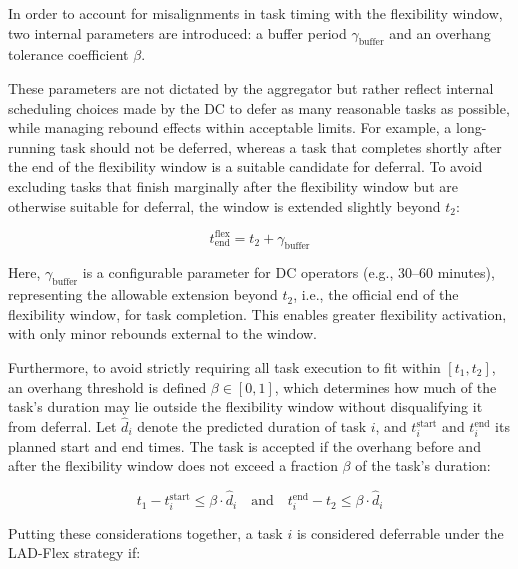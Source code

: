 \documentclass[preprint,12pt]{elsarticle}
\begin{document}
In order to account for misalignments in task timing with the flexibility window, two internal parameters are introduced: a buffer period $\gamma_{\text{buffer}}$ and an overhang tolerance coefficient $\beta$.

These parameters are not dictated by the aggregator but rather reflect internal scheduling choices made by the DC to defer as many reasonable tasks as possible, while managing rebound effects within acceptable limits. %
For example, a long-running task should not be deferred, whereas a task that completes shortly after the end of the flexibility window is a suitable candidate for deferral.
To avoid excluding tasks that finish marginally after the flexibility window but are otherwise suitable for deferral, the window is extended slightly beyond $t_2$:

\begin{equation}
    t_{\text{end}}^{\text{flex}} = t_2 + \gamma_{\text{buffer}}
\end{equation}

Here, $\gamma_{\text{buffer}}$ is a configurable parameter for DC operators (e.g., 30–60 minutes), representing the allowable extension beyond $t_2 $, i.e.,  the official end of the flexibility window, for task completion. This enables greater flexibility activation, with only minor rebounds external to the window.

Furthermore, to avoid strictly requiring all task execution to fit within $[t_1, t_2]$, an overhang threshold is defined $\beta \in [0, 1]$, which determines how much of the task's duration may lie outside the flexibility window without disqualifying it from deferral. Let $\hat{d}_i$ denote the predicted duration of task $i$, and $t_i^{\text{start}}$ and $t_i^{\text{end}}$ its planned start and end times. The task is accepted if the overhang before and after the flexibility window does not exceed a fraction $\beta$ of the task's duration:

\begin{equation}
    t_1 - t_i^{\text{start}} \leq \beta \cdot \hat{d}_i \quad \text{and} \quad t_i^{\text{end}} - t_2 \leq \beta \cdot \hat{d}_i
\end{equation}

Putting these considerations together, a task $i$ is considered deferrable under the LAD-Flex strategy if:
\end{document}
